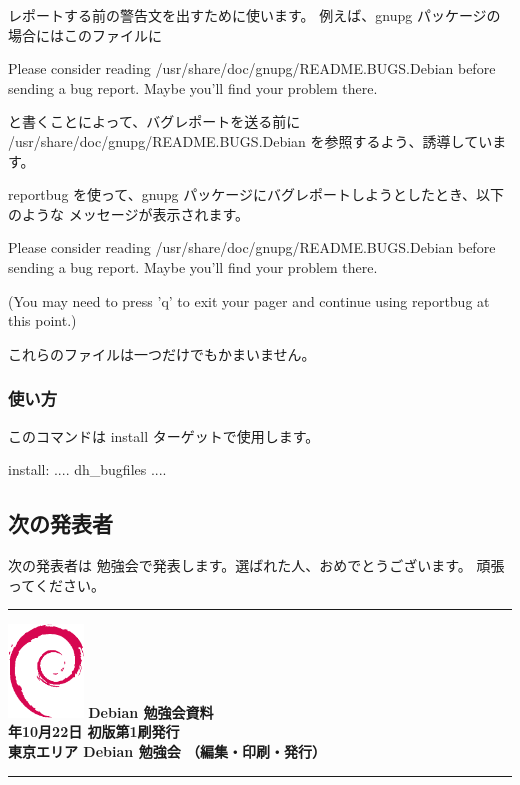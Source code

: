 \documentclass[mingoth,a4paper]{jsarticle}
\newcommand{\debmtgyear}{2011}
\newcommand{\debmtgmonth}{10}
\newcommand{\debmtgdate}{22}
\begin{document}
\begin{itemize}
レポートする前の警告文を出すために使います。
例えば、gnupg パッケージの場合にはこのファイルに
\begin{commandline}
Please consider reading /usr/share/doc/gnupg/README.BUGS.Debian before
sending a bug report. Maybe you'll find your problem there.
\end{commandline}
と書くことによって、バグレポートを送る前に /usr/share/doc/gnupg/README.BUGS.Debian 
を参照するよう、誘導しています。

reportbug を使って、gnupg パッケージにバグレポートしようとしたとき、以下のような
メッセージが表示されます。
\begin{commandline}
Please consider reading /usr/share/doc/gnupg/README.BUGS.Debian before
sending a bug report. Maybe you'll find your problem there.


(You may need to press 'q' to exit your pager and continue using
reportbug at this point.)
\end{commandline}

\end{itemize}

これらのファイルは一つだけでもかまいません。

\subsubsection{使い方}

このコマンドは install ターゲットで使用します。

\begin{commandline}
install:
    ....
    dh_bugfiles
    ....
\end{commandline}

\subsection{次の発表者}
次の発表者は 勉強会で発表します。選ばれた人、おめでとうございます。
頑張ってください。

\printindex

\cleartooddpage

\vspace*{15cm}
\hrule
\vspace{2mm}
\includegraphics[width=2cm]{image200502/openlogo-nd.eps}
\noindent \Large \bf Debian 勉強会資料\\
\noindent \normalfont \debmtgyear{}年\debmtgmonth{}月\debmtgdate{}日 \hspace{5mm}  初版第1刷発行\\
\noindent \normalfont 東京エリア Debian 勉強会 （編集・印刷・発行）\\
\hrule
\end{document}
